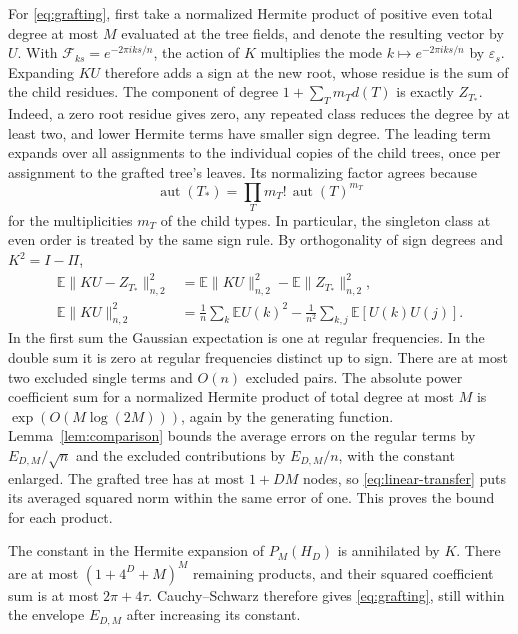 \documentclass[11pt,letterpaper]{article}
\newcommand{\E}{\mathbb E}
\newcommand{\aut}{\operatorname{aut}}
\newcommand{\norm}[1]{\lVert #1\rVert}
\begin{document}
For \eqref{eq:grafting}, first take a normalized Hermite product
of positive even total degree at most \(M\) evaluated at the tree
fields, and denote the resulting vector by \(U\). With
\(\mathcal F_{ks}=e^{-2\pi i ks/n}\), the action of \(K\) multiplies the
mode \(k\mapsto e^{-2\pi i ks/n}\) by \(\varepsilon_s\). Expanding
\(K U\) therefore adds a sign at the new root, whose residue is the
sum of the child residues. The component of degree
\(1+\sum_T m_T d(T)\) is exactly \(Z_{T_*}\). Indeed, a zero root
residue gives zero, any repeated class reduces the degree by at
least two, and lower Hermite terms have smaller sign degree. The
leading term expands over all assignments to the individual copies
of the child trees, once per assignment to the grafted tree's
leaves. Its normalizing factor agrees because
\[
 \aut(T_*)=\prod_T m_T!\,\aut(T)^{m_T}
\]
for the multiplicities \(m_T\) of the child types. In particular, the
singleton class at even order is treated by the same sign rule.
By orthogonality of sign degrees and \(K^2=I-\Pi\),
\begin{align*}
 \E\norm{K U-Z_{T_*}}_{n,2}^2
   &= \E\norm{K U}_{n,2}^2-\E\norm{Z_{T_*}}_{n,2}^2,\\
 \E\norm{K U}_{n,2}^2
   &= \frac1n\sum_k\E U(k)^2-\frac1{n^2}\sum_{k,j}\E[U(k)U(j)].
\end{align*}
In the first sum the Gaussian expectation is one at regular
frequencies. In the double sum it is zero at regular frequencies
distinct up to sign. There are at most two excluded single terms
and \(O(n)\) excluded pairs. The absolute
power coefficient sum for a normalized Hermite product of total
degree at most \(M\) is \(\exp(O(M\log(2M)))\), again by the generating
function. Lemma~\ref{lem:comparison} bounds the average errors on
the regular terms by \(E_{D,M}/\sqrt n\) and the excluded
contributions by \(E_{D,M}/n\), with the constant enlarged.
The grafted tree has
at most \(1+DM\) nodes, so \eqref{eq:linear-transfer} puts its averaged
squared norm within the same error of one. This proves the bound
for each product.

The constant in the Hermite expansion of \(P_M(H_D)\) is annihilated by
\(K\). There are at most \((1+4^D+M)^M\) remaining products, and their
squared coefficient sum is at most \(2\pi+4\tau\). Cauchy--Schwarz
therefore gives \eqref{eq:grafting}, still within the envelope
\(E_{D,M}\) after increasing its constant.
\end{document}
